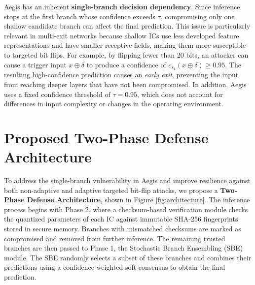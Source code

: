 \documentclass[conference,10pt]{IEEEtran}
\begin{document}
Aegis has an inherent \textbf{single-branch decision dependency}. Since inference stops at the first branch whose confidence exceeds $\tau$, compromising only one shallow candidate branch can affect the final prediction. This issue is particularly relevant in multi-exit networks because shallow ICs use less developed feature representations and have smaller receptive fields, making them more susceptible to targeted bit flips. For example, by flipping fewer than 20 bits, an attacker can cause a trigger input $x \oplus \delta$ to produce a confidence of $c_{s_1}(x \oplus \delta) \geq 0.95$. The resulting high-confidence prediction causes an \textit{early exit}, preventing the input from reaching deeper layers that have not been compromised. In addition, Aegis uses a fixed confidence threshold of $\tau = 0.95$, which does not account for differences in input complexity or changes in the operating environment.

\section{Proposed Two-Phase Defense Architecture}


To address the single-branch vulnerability in Aegis and improve resilience against both non-adaptive and adaptive targeted bit-flip attacks, we propose a \textbf{Two-Phase Defense Architecture}, shown in Figure \ref{fig:architecture}. The inference process begins with Phase 2, where a checksum-based verification module checks the quantized parameters of each IC against immutable SHA-256 fingerprints stored in secure memory. Branches with mismatched checksums are marked as compromised and removed from further inference. The remaining trusted branches are then passed to Phase 1, the Stochastic Branch Ensembling (SBE) module. The SBE randomly selects a subset of these branches and combines their predictions using a confidence weighted soft consensus to obtain the final prediction.
\end{document}
